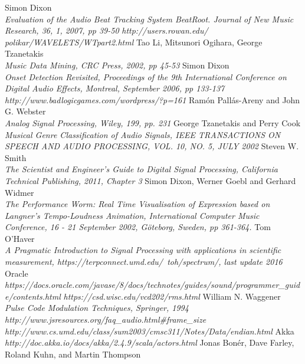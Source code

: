 \documentclass[a4paper, 11pt]{article}
\begin{document}
\begin{thebibliography}{99}
Simon Dixon\\
\textit{Evaluation of the Audio Beat Tracking System BeatRoot. Journal of New Music Research, 36, 1, 2007, pp 39-50}
\textit{http://users.rowan.edu/ polikar/WAVELETS/WTpart2.html}
Tao Li, Mitsunori Ogihara, George Tzanetakis\\
\textit{Music Data Mining, CRC Press, 2002, pp 45-53}
Simon Dixon\\
\textit{Onset Detection Revisited, Proceedings of the 9th International Conference on Digital Audio Effects, Montreal, September 2006, pp 133-137}
\textit{http://www.badlogicgames.com/wordpress/?p=161}
Ramón Pallás-Areny and John G. Webster\\
\textit{Analog Signal Processing, Wiley, 199, pp. 231}
George Tzanetakis and Perry Cook\\
\textit{Musical Genre Classification of Audio Signals, IEEE TRANSACTIONS ON SPEECH AND AUDIO PROCESSING, VOL. 10, NO. 5, JULY 2002}
Steven W. Smith\\
\textit{The Scientist and Engineer's Guide to Digital Signal Processing, California Technical Publishing, 2011, Chapter 3}
Simon Dixon, Werner Goebl and Gerhard Widmer\\
\textit{The Performance Worm: Real Time Visualisation of Expression based on Langner’s Tempo-Loudness Animation, International Computer Music Conference, 16 - 21 September 2002, Göteborg, Sweden, pp 361-364.}
Tom O'Haver\\
\textit{A Pragmatic Introduction to Signal Processing with applications in scientific measurement, https://terpconnect.umd.edu/~toh/spectrum/, last update 2016}
Oracle\\
\textit{https://docs.oracle.com/javase/8/docs/technotes/guides/sound/programmer\_guide/contents.html}
\textit{https://csd.wisc.edu/vcd202/rms.html}
William N. Waggener\\
\textit{Pulse Code Modulation Techniques, Springer, 1994}
\textit{http://www.jsresources.org/faq\_audio.html\#frame\_size}
\textit{http://www.cs.umd.edu/class/sum2003/cmsc311/Notes/Data/endian.html}
Akka\\
\textit{http://doc.akka.io/docs/akka/2.4.9/scala/actors.html}
Jonas Bonér, Dave Farley, Roland Kuhn, and Martin Thompson\\

\end{thebibliography}
\end{document}
